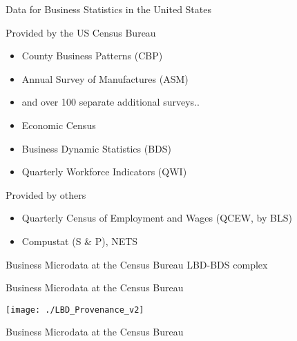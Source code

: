 \begin{frame}{Data for Business Statistics in the United States}
\begin{block}{Provided by the US Census Bureau}
\begin{itemize}
\item County Business Patterns (CBP)
\item Annual Survey of Manufactures (ASM)
\item and over 100 separate additional surveys..
\item Economic Census
\item Business Dynamic Statistics (BDS)
\item Quarterly Workforce Indicators (QWI)
\end{itemize}
\end{block}
\pause
\begin{block}{Provided by others}
\begin{itemize}
\item Quarterly Census of Employment and Wages (QCEW, by BLS)
\item Compustat (S \& P), \acf{NETS}
\end{itemize}
\end{block}
\end{frame}

\begin{frame}{Business Microdata at the Census Bureau}
\vfill
\Huge LBD-BDS complex
\end{frame}

\begin{frame}{Business Microdata at the Census Bureau}
\begin{center}
\texttt{[image: ./LBD\_Provenance\_v2]}
\end{center}
\end{frame}

\begin{frame}{Business Microdata at the Census Bureau}
\pause
{}
\end{frame}



